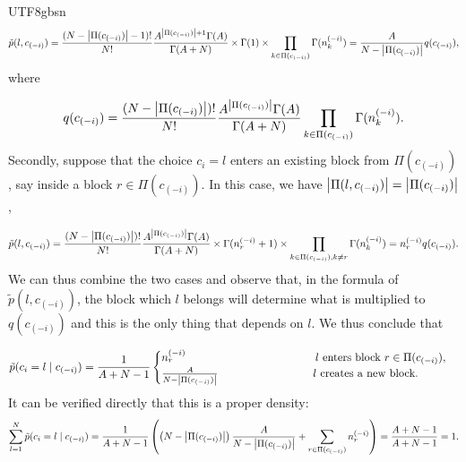 \documentclass[12pt]{report}
\newcommand\tab[1][1cm]{\hspace*{#1}}
\newcommand{\bracket}[1]{\left ( #1 \right )}
\theoremstyle{plain}
\theoremstyle{definition}
\begin{document}
\begin{CJK*}{UTF8}{gbsn}
\begin{equation*}
  \tilde{p}(l,c_{(-i)}) = 
  \frac{(N-\abs{\Pi(c_{(-i)})}-1)!}{N!}
 \frac{A^{\abs{\Pi(c_{(-i)})}+1} \Gamma(A)}{\Gamma(A + N)} \times \Gamma(1) \times \prod_{k \in \Pi(c_{(-i)})} \Gamma(n_k^{(-i)})
 = \frac{A}{N - \abs{\Pi(c_{(-i)})}} q(c_{(-i)}),
\end{equation*}
where 

\begin{equation*}
  q(c_{(-i)}) = \frac{(N-\abs{\Pi(c_{(-i)})})!}{N!} \frac{A^{\abs{\Pi(c_{(-i)})}} 
  \Gamma(A)}{\Gamma(A + N)} \prod_{k \in \Pi(c_{(-i)})} \Gamma(n_k^{(-i)}).
\end{equation*}
Secondly, suppose that the choice $c_i=l$ enters an existing block from $\Pi(c_{(-i)})$,
say inside a block $r \in \Pi(c_{(-i)})$.
In this case, we have $\abs{\Pi(l, c_{(-i)})} = \abs{\Pi(c_{(-i)})}$,

\begin{equation*}
  \tilde{p}(l,c_{(-i)}) = 
  \frac{(N-\abs{\Pi(c_{(-i)})})!}{N!}
 \frac{A^{\abs{\Pi(c_{(-i)})}} \Gamma(A)}{\Gamma(A + N)} \times \Gamma(n_r^{(-i)}+1) \times \prod_{k \in \Pi(c_{(-i)}), k \neq r} \Gamma(n_k^{(-i)})
 = n_r^{(-i)} q(c_{(-i)}).
\end{equation*}
We can thus combine the two cases and observe that, in the formula
of $\tilde{p}(l,c_{(-i)})$, the block which $l$ belongs will determine what 
is multiplied to $q(c_{(-i)})$ and this is the only thing that depends on $l$.
We thus conclude that 

\begin{equation}\label{eq:c_l_conditional_prior}
  \tilde{p}(c_i = l \mid c_{(-i)}) =  \frac{1}{A+N-1}
  \begin{cases}
    n_r^{(-i)} \tab[4.1cm] \text{$l$ enters block $r \in \Pi(c_{(-i)})$},\\
    \frac{A}{N - \abs{\Pi(c_{(-i)})}} \tab[3cm] \text{$l$ creates a new block}.
  \end{cases}
\end{equation}
It can be verified directly that this is a proper density:
\begin{equation*}
  \sum_{l=1}^{N} \tilde{p}(c_i = l \mid c_{(-i)})
  = \frac{1}{A+N-1} \bracket{\bracket{N - \abs{\Pi(c_{(-i)})}} \frac{A}{N - \abs{\Pi(c_{(-i)})}} + 
  \sum_{r \in \Pi(c_{(-i)})} n_r^{(-i)}}
  = \frac{A + N - 1}{A + N - 1} = 1.
\end{equation*}


\end{CJK*}
\end{document}
